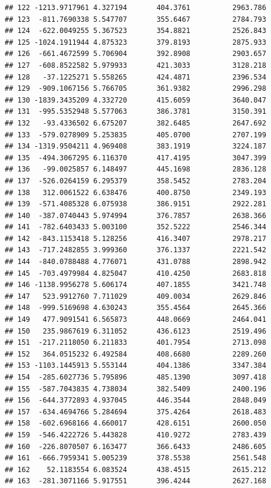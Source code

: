 \documentclass[
]{article}
\begin{document}
\begin{verbatim}
## 122 -1213.9717961 4.327194       404.3761          2963.786
## 123  -811.7690338 5.547707       355.6467          2784.793
## 124  -622.0049255 5.367523       354.8821          2526.843
## 125 -1024.1911944 4.875323       379.8193          2875.933
## 126  -661.4672599 5.706904       392.8908          2903.657
## 127  -608.8522582 5.979933       421.3033          3128.218
## 128   -37.1225271 5.558265       424.4871          2396.534
## 129  -909.1067156 5.766705       361.9382          2996.298
## 130 -1839.3435209 4.332720       415.6059          3640.047
## 131  -995.5352948 5.577063       386.3781          3150.391
## 132   -93.4336502 6.675207       382.6485          2647.692
## 133  -579.0278909 5.253835       405.0700          2707.199
## 134 -1319.9504211 4.969408       383.1919          3224.187
## 135  -494.3067295 6.116370       417.4195          3047.399
## 136   -99.0025857 6.148497       445.1698          2836.128
## 137  -526.0264159 6.295379       358.5452          2783.204
## 138   312.0061522 6.638476       400.8750          2349.193
## 139  -571.4085328 6.075938       386.9151          2922.281
## 140  -387.0740443 5.974994       376.7857          2638.366
## 141  -782.6403433 5.003100       352.5222          2546.344
## 142  -843.1153418 5.128256       416.3407          2978.217
## 143  -717.2482855 3.999360       376.1337          2221.542
## 144  -840.0788488 4.776071       431.0788          2898.942
## 145  -703.4979984 4.825047       410.4250          2683.818
## 146 -1138.9956278 5.606174       407.1855          3421.748
## 147   523.9912760 7.711029       409.0034          2629.846
## 148  -999.5169698 4.630243       355.4564          2645.366
## 149   477.9091541 6.565873       448.0669          2464.041
## 150   235.9867619 6.311052       436.6123          2519.496
## 151  -217.2118050 6.211833       401.7954          2713.098
## 152   364.0515232 6.492584       408.6680          2289.260
## 153 -1103.1445913 5.553144       404.1386          3347.384
## 154  -285.6027736 5.795896       485.1390          3097.418
## 155  -587.7043835 4.738034       382.5409          2400.196
## 156  -644.3772893 4.937045       446.3544          2848.049
## 157  -634.4694766 5.284694       375.4264          2618.483
## 158  -602.6968166 4.660017       428.6151          2600.050
## 159  -546.4222726 5.443828       410.9272          2783.439
## 160  -226.8070507 6.163477       366.6433          2486.605
## 161  -666.7959341 5.005239       378.5538          2561.548
## 162    52.1183554 6.083524       438.4515          2615.212
## 163  -281.3071166 5.917551       396.4244          2627.168

\end{verbatim}
\end{document}
